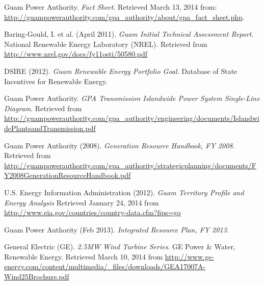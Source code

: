 \documentclass[12pt,letterpaper,fleqn]{report}
\begin{document}
\begin{thebibliography}{99}

  Guam Power Authority.
  \emph{Fact Sheet}.
  Retrieved March 13, 2014 from: 
  \url{http://guampowerauthority.com/gpa_authority/about/gpa_fact_sheet.php}.

  Baring-Gould, I. et al. (April 2011).
  \emph{Guam Initial Technical Assessment Report}.
  National Renewable Energy Laboratory (NREL).
  Retrieved from \url{http://www.nrel.gov/docs/fy11osti/50580.pdf}

  DSIRE (2012).
  \emph{Guam Renewable Energy Portfolio Goal}.
  Database of State Incentives for Renewable Energy.
  
  Guam Power Authority.
  \emph{GPA Transmission Islandwide Power System Single-Line Diagram}.
  Retrieved from 
  \url{http://guampowerauthority.com/gpa_authority/engineering/documents/IslandwidePlantsandTransmission.pdf}

  Guam Power Authority (2008).
  \emph{Generation Resource Handbook, FY 2008}.
  Retrieved from
  \url{http://guampowerauthority.com/gpa_authority/strategicplanning/documents/FY2008GenerationResourceHandbook.pdf}

  U.S. Energy Information Administration (2012).
  \emph{Guam Territory Profile and Energy Analysis}
  Retrieved January 24, 2014 from
  \url{http://www.eia.gov/countries/country-data.cfm?fips=gq}
  
  Guam Power Authority (Feb 2013).
  \emph{Integrated Resource Plan, FY 2013}.

  General Electric (GE).
  \emph{2.5MW Wind Turbine Series}.
  GE Power \& Water, Renewable Energy.
  Retrieved March 10, 2014 from
  \url{http://www.ge-energy.com/content/multimedia/_files/downloads/GEA17007A-Wind25Brochure.pdf}

\end{thebibliography}
\end{document}
